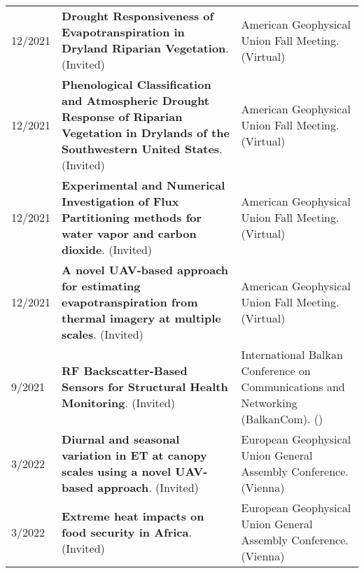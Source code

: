 \begin{longtable}{lp{9.0cm}p{4.5cm}}
12/2021 & {\bf Drought Responsiveness of Evapotranspiration in Dryland Riparian Vegetation}.   (Invited)  & American Geophysical Union Fall Meeting. (Virtual) \\
  
12/2021 & {\bf Phenological Classification and Atmospheric Drought Response of Riparian Vegetation in Drylands of the Southwestern United States}.   (Invited)  & American Geophysical Union Fall Meeting. (Virtual) \\
  
12/2021 & {\bf Experimental and Numerical Investigation of Flux Partitioning methods for water vapor and carbon dioxide}.   (Invited)  & American Geophysical Union Fall Meeting. (Virtual) \\
  
12/2021 & {\bf A novel UAV-based approach for estimating evapotranspiration from thermal imagery at multiple scales}.   (Invited)  & American Geophysical Union Fall Meeting. (Virtual) \\
  
9/2021 & {\bf RF Backscatter-Based Sensors for Structural Health Monitoring}.   (Invited)  & International Balkan Conference on Communications and Networking (BalkanCom). () \\
  
3/2022 & {\bf Diurnal and seasonal variation in ET at canopy scales using a novel UAV-based approach}.   (Invited)  & European Geophysical Union General Assembly Conference. (Vienna) \\
  
3/2022 & {\bf Extreme heat impacts on food security in Africa}.   (Invited)  & European Geophysical Union General Assembly Conference. (Vienna) \\
 \end{longtable}

